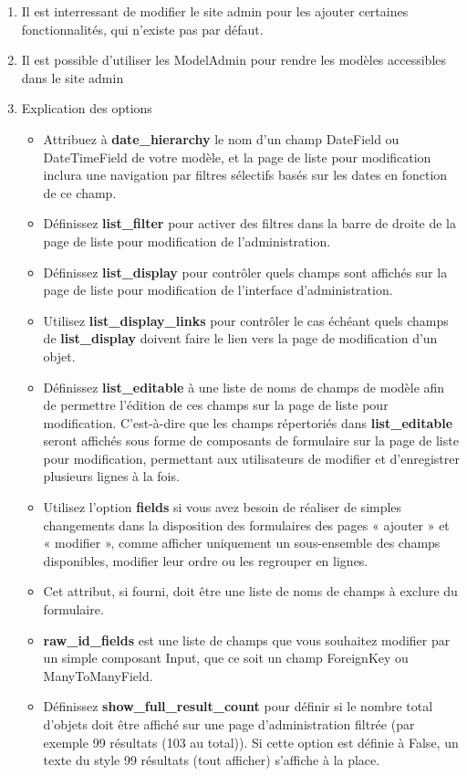 \documentclass[11pt,a4paper]{article}
\begin{document}
\begin{enumerate}
	\item Il est interressant de modifier le site admin pour les ajouter certaines fonctionnalités, qui n'existe pas par défaut.
	\item Il est possible d'utiliser les ModelAdmin pour rendre les modèles accessibles dans le site admin
	\item Explication des options 
		\begin{itemize}
		\item Attribuez à \textbf{date\_hierarchy} le nom d’un champ DateField ou DateTimeField de votre modèle, et la page de liste pour modification inclura une navigation par filtres sélectifs basés sur les dates en fonction de ce champ.
		\item Définissez \textbf{list\_filter} pour activer des filtres dans la barre de droite de la page de liste pour modification de l’administration.
		\item Définissez \textbf{list\_display} pour contrôler quels champs sont affichés sur la page de liste pour modification de l’interface d’administration.
		\item Utilisez \textbf{list\_display\_links} pour contrôler le cas échéant quels champs de \textbf{list\_display} doivent faire le lien vers la page de modification d’un objet.
		\item Définissez \textbf{list\_editable} à une liste de noms de champs de modèle afin de permettre l’édition de ces champs sur la page de liste pour modification. C’est-à-dire que les champs répertoriés dans \textbf{list\_editable} seront affichés sous forme de composants de formulaire sur la page de liste pour modification, permettant aux utilisateurs de modifier et d’enregistrer plusieurs lignes à la fois.
		\item Utilisez l’option \textbf{fields} si vous avez besoin de réaliser de simples changements dans la disposition des formulaires des pages « ajouter » et « modifier », comme afficher uniquement un sous-ensemble des champs disponibles, modifier leur ordre ou les regrouper en lignes.
		\item Cet attribut, si fourni, doit être une liste de noms de champs à exclure du formulaire.
		\item \textbf{raw\_id\_fields} est une liste de champs que vous souhaitez modifier par un simple composant Input, que ce soit un champ ForeignKey ou ManyToManyField.
		\item Définissez \textbf{show\_full\_result\_count} pour définir si le nombre total d’objets doit être affiché sur une page d’administration filtrée (par exemple 99 résultats (103 au total)). Si cette option est définie à False, un texte du style 99 résultats (tout afficher) s’affiche à la place.

\end{itemize}
\end{enumerate}
\end{document}

